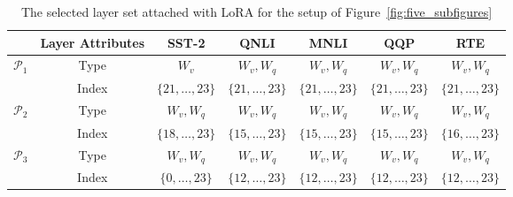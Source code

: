 \documentclass{article}
\theoremstyle{plain}
\theoremstyle{definition}
\theoremstyle{remark}
\begin{document}
 \begin{table}[h!]
\centering
{\footnotesize
    \begin{tabular}{ccccccc}
    \toprule
                            & Layer Attributes & SST-2 & QNLI & MNLI & QQP & RTE \\
                            \midrule
\multirow{2}{*}{$\mathcal{P}_1$} & Type             &   $W_v$    &    $W_v,W_q$    &   $W_v,W_q$     &    $W_v,W_q$   &    $W_v,W_q$   \\
                    & Index            &  $\{21,\ldots,23\}$  &   $\{21,\ldots,23\}$    &   $\{21,\ldots,23\}$    &   $\{21,\ldots,23\}$   &  $\{21,\ldots,23\}$   \\
\multirow{2}{*}{$\mathcal{P}_2$} & Type             &     $W_v,W_q$   &  $W_v,W_q$     &   $W_v,W_q$    &   $W_v,W_q$   &   $W_v,W_q$   \\
                    & Index            &   $\{18,\ldots,23\}$    &   $\{15,\ldots,23\}$   &  $\{15,\ldots,23\}$    &   $\{15,\ldots,23\}$  &  $\{16,\ldots,23\}$   \\
\multirow{2}{*}{$\mathcal{P}_3$} & Type             &  $W_v,W_q$     &   $W_v,W_q$    &   $W_v,W_q$    &  $W_v,W_q$    &  $W_v,W_q$    \\
                    & Index            &    $\{0,\ldots,23\}$  &  $\{12,\ldots,23\}$    &   $\{12,\ldots,23\}$   &   $\{12,\ldots,23\}$  &   $\{12,\ldots,23\}$  \\ \bottomrule
    \end{tabular}}
    \vspace{4pt}
    \caption{The selected layer set attached with LoRA for the setup of Figure~\ref{fig:five_subfigures}}
    \label{tab:layer_type_index}
\end{table}
\end{document}
